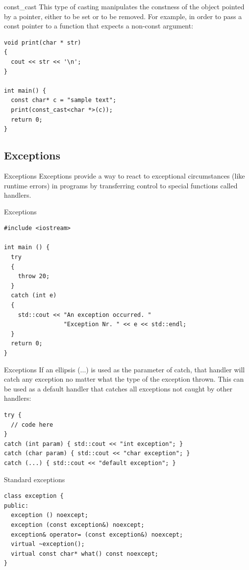 \documentclass{beamer}
\begin{document}
\begin{frame}[fragile]{const\_cast}
This type of casting manipulates the constness of the object pointed by a
pointer, either to be set or to be removed. For example, in order to pass a
const pointer to a function that expects a non-const argument:
\begin{lstlisting}
void print(char * str)
{
  cout << str << '\n';
}

int main() {
  const char* c = "sample text";
  print(const_cast<char *>(c));
  return 0;
}
\end{lstlisting}
\end{frame}

\subsection{Exceptions}
\begin{frame}{Exceptions}
Exceptions provide a way to react to exceptional circumstances (like runtime
errors) in programs by transferring control to special functions called
handlers. 
\end{frame}

\begin{frame}[fragile]{Exceptions}
\begin{lstlisting}
#include <iostream>

int main () {
  try
  {
    throw 20;
  }
  catch (int e)
  {
    std::cout << "An exception occurred. "
                 "Exception Nr. " << e << std::endl;
  }
  return 0;
}
\end{lstlisting}
\end{frame}

\begin{frame}[fragile]{Exceptions}
If an ellipsis (...) is used as the parameter of catch, that handler will catch
any exception no matter what the type of the exception thrown. This can be used
as a default handler that catches all exceptions not caught by other handlers:
\begin{lstlisting}
try {
  // code here
}
catch (int param) { std::cout << "int exception"; }
catch (char param) { std::cout << "char exception"; }
catch (...) { std::cout << "default exception"; }
\end{lstlisting}
\end{frame}

\begin{frame}[fragile]{Standard exceptions}
\begin{lstlisting}
class exception {
public:
  exception () noexcept;
  exception (const exception&) noexcept;
  exception& operator= (const exception&) noexcept;
  virtual ~exception();
  virtual const char* what() const noexcept;
}
\end{lstlisting}
\end{frame}
\end{document}
